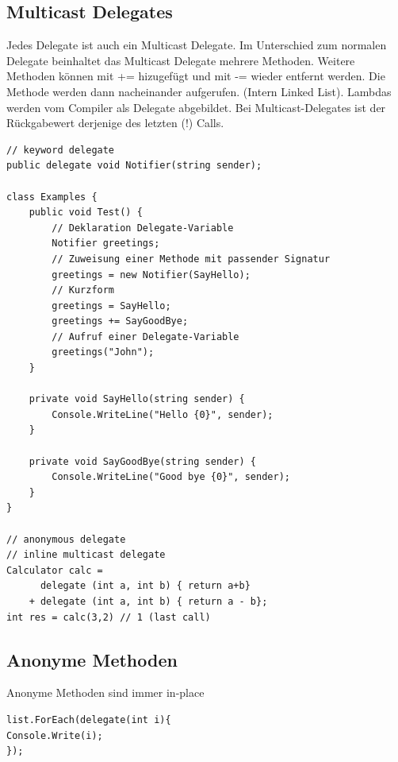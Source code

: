 \documentclass[
a4paper,
oneside,
10pt,
fleqn,
headsepline,
toc=listofnumbered, 
bibliography=totocnumbered]{scrartcl}
\begin{document}
\subsection{Multicast Delegates}
Jedes Delegate ist auch ein Multicast Delegate. Im Unterschied zum normalen Delegate beinhaltet das Multicast Delegate mehrere Methoden. Weitere Methoden können mit += hizugefügt und mit -= wieder entfernt werden. Die Methode werden dann nacheinander aufgerufen. (Intern Linked List). Lambdas werden vom Compiler als Delegate abgebildet. Bei Multicast-Delegates ist der Rückgabewert derjenige des letzten (!) Calls.
\begin{lstlisting}
// keyword delegate
public delegate void Notifier(string sender);

class Examples {
	public void Test() {
		// Deklaration Delegate-Variable
		Notifier greetings; 
		// Zuweisung einer Methode mit passender Signatur
		greetings = new Notifier(SayHello); 
		// Kurzform
		greetings = SayHello;
		greetings += SayGoodBye;
		// Aufruf einer Delegate-Variable
		greetings("John");
	}

	private void SayHello(string sender) {
		Console.WriteLine("Hello {0}", sender);
	}
	
	private void SayGoodBye(string sender) {
		Console.WriteLine("Good bye {0}", sender);
	}
}

// anonymous delegate
// inline multicast delegate
Calculator calc =  
	  delegate (int a, int b) { return a+b}
	+ delegate (int a, int b) { return a - b};
int res = calc(3,2) // 1 (last call)
\end{lstlisting}

\subsection{Anonyme Methoden}
Anonyme Methoden sind immer in-place
\begin{lstlisting}
list.ForEach(delegate(int i){
Console.Write(i);
});
\end{lstlisting}

\clearpage
\end{document}
